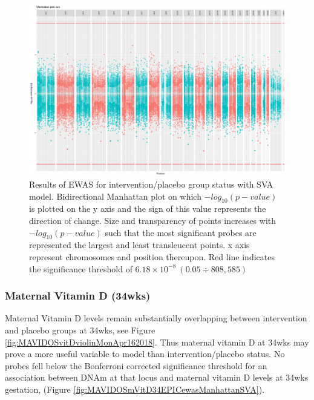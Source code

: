 \documentclass[]{book}
\begin{document}
\begin{figure}

{\centering \includegraphics[width=0.8\linewidth]{figs/MAVIDOSccEPICewasManhattanSVA} 

}

\caption{Results of EWAS for intervention/placebo group status with SVA model. Bidirectional Manhattan plot on which \(-log_{10}(p-value)\) is plotted on the y axis and the sign of this value represents the direction of change. Size and transparency of points increases with \(-log_{10}(p-value)\) such that the most significant probes are represented the largest and least transleucent points. x axis represent chromosomes and position thereupon. Red line indicates the significance threshold of \(6.18\times10^{-8}~(0.05\div808,585)\)}\label{fig:MAVIDOSccEPICewasManhattanSVA}
\end{figure}



\hypertarget{maternal-vitamin-d-34wks}{%
\subsubsection{Maternal Vitamin D (34wks)}\label{maternal-vitamin-d-34wks}}

Maternal Vitamin D levels remain substantially overlapping between intervention and placebo groups at 34wks, see Figure \ref{fig:MAVIDOSvitDviolinMonApr162018}. Thus maternal vitamin D at 34wks may prove a more useful variable to model than intervention/placebo status. No probes fell below the Bonferroni corrected significance threshold for an association between DNAm at that locus and maternal vitamin D levels at 34wks gestation, (Figure \ref{fig:MAVIDOSmVitD34EPICewasManhattanSVA}).
\end{document}
